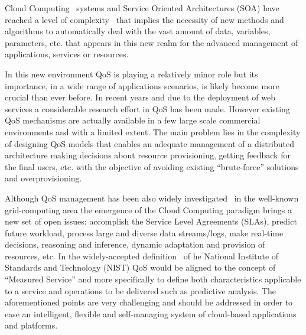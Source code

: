 Cloud Computing~\cite{mell2011nist} systems and Service Oriented Architectures (SOA) have 
reached a level of complexity~\cite{Huebscher:2008:SAC:1380584.1380585,Conejero:2012:MSQ:2357487.2357591} that implies the necessity of new methods 
and algorithms to automatically deal with the vast amount of data, variables, 
parameters, etc. that appears in this new realm for the advanced management of 
applications, services or resources. 

In this new environment QoS is playing a relatively minor role but its 
importance, in a wide range of applications scenarios, is likely become more 
crucial than ever before. In recent years and due to the deployment of web 
services a considerable research effort in QoS has been made. However existing 
QoS mechanisms are actually available in a few large scale commercial 
environments and with a limited extent. The main problem lies in the complexity 
of designing QoS models that enables an adequate management of a distributed 
architecture making decisions about resource provisioning, getting feedback for 
the final users, etc. with the objective of avoiding existing ``brute-force''
solutions and overprovisioning. 

Although QoS management has been also widely investigated~\cite{Conejero:2012:MSQ:2357487.2357591} 
in the well-known grid-computing area the emergence of the Cloud Computing paradigm 
brings a new set of open issues: accomplish the  Service Level Agreements (SLAs), predict 
future workload, process large and diverse data streams/logs, make real-time 
decisions, reasoning and inference, dynamic adaptation and provision of 
resources, etc. In the widely-accepted definition~\cite{mell2011nist} of 
he National Institute of Standards and Technology (NIST) QoS 
would be aligned to the concept of ``Measured Service'' and more specifically to define both characteristics applicable to a service and operations 
to be delivered such as predictive analysis. 
The aforementioned points are very challenging and should be 
addressed in order to ease an intelligent, flexible and self-managing system of 
cloud-based applications and platforms.

% 

